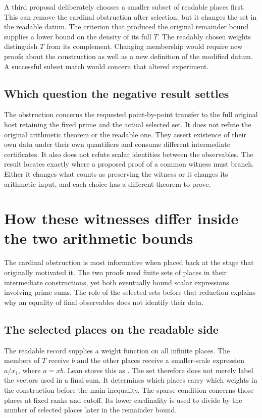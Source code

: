 \documentclass[12pt,letterpaper]{article}
\newcommand{\id}[1]{\ifmmode\text{\small\nolinkurl{#1}}\else{\small\nolinkurl{#1}}\fi}
\begin{document}
A third proposal deliberately chooses a smaller subset of readable places first. This can remove the cardinal obstruction after selection, but it changes the set in the readable datum. The criterion that produced the original remainder bound supplies a lower bound on the density of its full $T$. The readably chosen weights distinguish $T$ from its complement. Changing membership would require new proofs about the construction as well as a new definition of the modified datum. A successful subset match would concern that altered experiment.

\subsection{Which question the negative result settles}
The obstruction concerns the requested point-by-point transfer to the full original host retaining the fixed prime and the actual selected set. It does not refute the original arithmetic theorem or the readable one. They assert existence of their own data under their own quantifiers and consume different intermediate certificates. It also does not refute scalar identities between the observables. The result locates exactly where a proposed proof of a common witness must branch. Either it changes what counts as preserving the witness or it changes its arithmetic input, and each choice has a different theorem to prove.


\section{How these witnesses differ inside the two arithmetic bounds}
The cardinal obstruction is most informative when placed back at the stage that originally motivated it. The two proofs need finite sets of places in their intermediate constructions, yet both eventually bound scalar expressions involving prime sums. The role of the selected sets before that reduction explains why an equality of final observables does not identify their data.

\subsection{The selected places on the readable side}
The readable \id{Data} record supplies a weight function on all infinite places. The members of $T$ receive $b$ and the other places receive a smaller-scale expression $a/x_1$, where $a=xb$. Lean stores this as \id{weight_eq}. The set therefore does not merely label the vectors used in a final sum. It determines which places carry which weights in the construction before the main inequality. The sparse condition concerns those places at fixed ranks and cutoff. Its lower cardinality is used to divide by the number of selected places later in the remainder bound.
\end{document}
